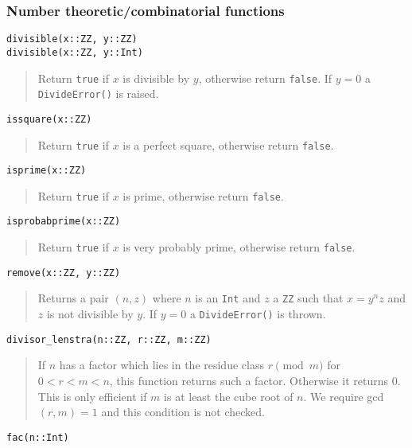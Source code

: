 \documentclass[a4paper,10pt]{article}
\newcommand{\code}{\lstinline}
\newcommand{\desc}[1]{\vspace{-3mm}\begin{quote}#1\end{quote}}
\begin{document}
{{{\subsubsection{Number theoretic/combinatorial functions}

\begin{lstlisting}
divisible(x::ZZ, y::ZZ)
divisible(x::ZZ, y::Int)
\end{lstlisting}

\desc{Return \code{true} if $x$ is divisible by $y$, otherwise return \code{false}. If
$y = 0$ a \code{DivideError()} is raised.}

\begin{lstlisting}
issquare(x::ZZ)
\end{lstlisting}

\desc{Return \code{true} if $x$ is a perfect square, otherwise return \code{false}.}

\begin{lstlisting}
isprime(x::ZZ)
\end{lstlisting}

\desc{Return \code{true} if $x$ is prime, otherwise return \code{false}.}

\begin{lstlisting}
isprobabprime(x::ZZ)
\end{lstlisting}

\desc{Return \code{true} if $x$ is very probably prime, otherwise return \code{false}.}

\begin{lstlisting}
remove(x::ZZ, y::ZZ)
\end{lstlisting}

\desc{Returns a pair $(n, z)$ where $n$ is an \code{Int} and $z$ a \code{ZZ} such that
$x = y^nz$ and $z$ is not divisible by $y$. If $y = 0$ a \code{DivideError()} is thrown.}

\begin{lstlisting}
divisor_lenstra(n::ZZ, r::ZZ, m::ZZ)
\end{lstlisting}

\desc{If $n$ has a factor which lies in the residue class $r \pmod{m}$ for $0 < r < m < n$,
this function returns such a factor. Otherwise it returns $0$. This is only efficient if 
$m$ is at least the cube root of $n$. We require gcd$(r, m) = 1$ and this condition is not
checked.}

\begin{lstlisting}
fac(n::Int)
\end{lstlisting}

}}}
\end{document}
